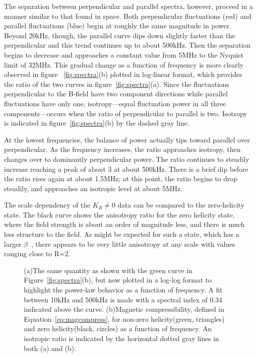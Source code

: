 \documentclass[manuscript]{aastex}
\begin{document}
The separation between perpendicular and parallel spectra, however, proceed in a manner similar to that found in space. Both perpendicular fluctuations (red) and parallel fluctuations (blue) begin at roughly the same magnitude in power. Beyond 20kHz, though, the parallel curve dips down slightly faster than the perpendicular and this trend continues up to about 500kHz. Then the separation begins to decrease and approaches a constant value from 5MHz to the Nyquist limit of 32MHz. This gradual change as a function of frequency is more clearly observed in figure ~\ref{fig:spectra}(b) plotted in log-linear format, which provides the ratio of the two curves in figure~\ref{fig:spectra}(a). Since the fluctuations perpendicular to the B-field have two component directions while parallel fluctuations have only one, isotropy---equal fluctuation power in all three components---occurs when the ratio of perpendicular to parallel is two. Isotropy is indicated in figure~\ref{fig:spectra}(b) by the dashed gray line.

At the lowest frequencies, the balance of power actually tips toward parallel over perpendicular. As the frequency increases, the ratio approaches isotropy, then changes over to dominantly perpendicular power. The ratio continues to steadily increase reaching a peak of about 3 at about 500kHz. There is a brief dip before the ratio rises again at about 1.5MHz; at this point, the ratio begins to drop steadily, and approaches an isotropic level at about 5MHz. 

The scale dependency of the $K_{B}\neq 0$ data can be compared to the zero-helicity state. The black curve shows the anisotropy ratio for the zero helicity state, where the field strength is about an order of magnitude less, and there is much less structure to the field. As might be expected for such a state, which has a larger $\beta$~\citep{smi06,sar14}, there appears to be very little anisotropy at any scale with values ranging close to R=2.

\begin{figure}
\caption{\label{fig:fitratio} (a)The same quantity as shown with the green curve in Figure~\ref{fig:spectra}(b), but now plotted in a log-log format to highlight the power-law behavior as a function of frequency. A fit between 10kHz and 500kHz is made with a spectral index of 0.34 indicated above the curve. (b)Magnetic compressibility, defined in Equation~\ref{eq:magcompress}, for non-zero helicity(green, triangles) and zero helicity(black, circles) as a function of frequency. An isotropic ratio is indicated by the horizontal dotted gray lines in both (a) and (b).}
\end{figure}
\end{document}
